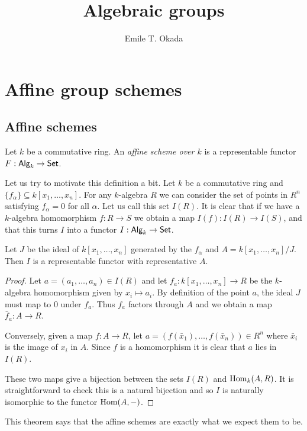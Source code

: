 \documentclass{memoir}
\title{Algebraic groups}
\author{Emile T. Okada}
\begin{document}
\maketitle
\tableofcontents
\chapter{Affine group schemes}
\section{Affine schemes}
\begin{definition}
    Let $k$ be a commutative ring. An \textit{affine scheme over $k$} is a representable functor $F:{\normalfont\mathsf{Alg}}_k\to {\normalfont\mathsf{Set}}$.
\end{definition}
Let us try to motivate this definition a bit. 
Let $k$ be a commutative ring and $\{f_\alpha\}\subseteq k[x_1,\dots,x_n]$.
For any $k$-algebra $R$ we can consider the set of points in $R^n$ satisfying $f_\alpha = 0$ for all $\alpha$.
Let us call this set $I(R)$.
It is clear that if we have a $k$-algebra homomorphism $f:R\to S$ we obtain a map $I(f):I(R) \to I(S)$, and that this turns $I$ into a functor $I:{\normalfont\mathsf{Alg}}_k\to {\normalfont\mathsf{Set}}$.
\begin{thm}
    Let $J$ be the ideal of $k[x_1,\dots,x_n]$ generated by the $f_\alpha$ and $A = k[x_1,\dots,x_n]/J$.
    Then $I$ is a representable functor with representative $A$.
\end{thm}
\begin{proof}
    Let $a = (a_1,\dots,a_n)\in I(R)$ and let $f_a:k[x_1,\dots,x_n]\to R$ be the $k$-algebra homomorphism given by $x_i\mapsto a_i$.
    By definition of the point $a$, the ideal $J$ must map to 0 under $f_a$.
    Thus $f_a$ factors through $A$ and we obtain a map $\bar f_a: A\to R$.

    Conversely, given a map $f:A\to R$, let $a = (f(\bar x_1),\dots,f(\bar x_n))\in R^n$ where $\bar x_i$ is the image of $x_i$ in $A$.
    Since $f$ is a homomorphism it is clear that $a$ lies in $I(R)$.

    These two maps give a bijection between the sets $I(R)$ and $\operatorname{Hom}_k(A,R)$.
    It is straightforward to check this is a natural bijection and so $I$ is naturally isomorphic to the functor $\operatorname{Hom}(A,-)$.
\end{proof}
This theorem says that the affine schemes are exactly what we expect them to be.
\end{document}
